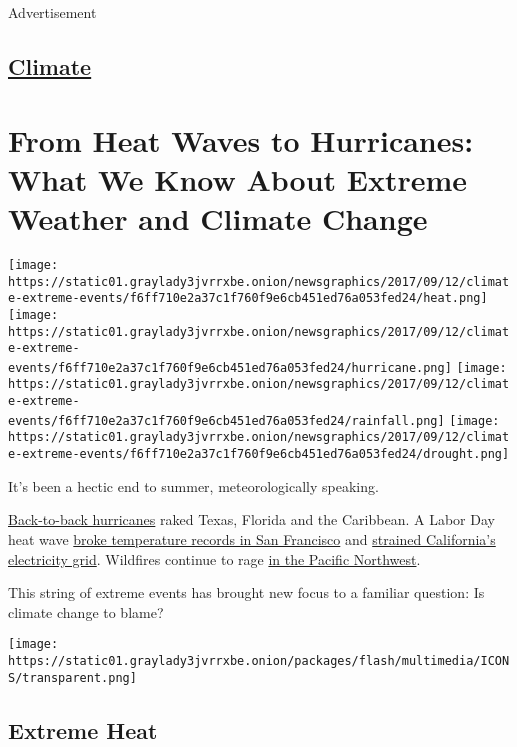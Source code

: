 Advertisement

\hypertarget{-climate-}{%
\subsection{\texorpdfstring{ \href{/section/climate}{Climate}
}{ Climate }}\label{-climate-}}

\hypertarget{from-heat-waves-to-hurricanes-what-we-know-about-extreme-weather-and-climate-change}{%
\section{From Heat Waves to Hurricanes: What We Know About Extreme
Weather and Climate
Change}\label{from-heat-waves-to-hurricanes-what-we-know-about-extreme-weather-and-climate-change}}

\texttt{[image: https://static01.graylady3jvrrxbe.onion/newsgraphics/2017/09/12/climate-extreme-events/f6ff710e2a37c1f760f9e6cb451ed76a053fed24/heat.png]}
\texttt{[image: https://static01.graylady3jvrrxbe.onion/newsgraphics/2017/09/12/climate-extreme-events/f6ff710e2a37c1f760f9e6cb451ed76a053fed24/hurricane.png]}
\texttt{[image: https://static01.graylady3jvrrxbe.onion/newsgraphics/2017/09/12/climate-extreme-events/f6ff710e2a37c1f760f9e6cb451ed76a053fed24/rainfall.png]}
\texttt{[image: https://static01.graylady3jvrrxbe.onion/newsgraphics/2017/09/12/climate-extreme-events/f6ff710e2a37c1f760f9e6cb451ed76a053fed24/drought.png]}

It's been a hectic end to summer, meteorologically speaking.

\href{https://www.nytimes3xbfgragh.onion/2017/09/06/climate/storms-harvey-irma-jose.html}{Back-to-back
hurricanes} raked Texas, Florida and the Caribbean. A Labor Day heat
wave
\href{https://weather.com/forecast/regional/news/west-heat-wave-all-time-record-heat-early-september-2017}{broke
temperature records in San Francisco} and
\href{http://www.latimes.com/local/lanow/la-me-ln-heat-warnings-socal-20170829-story.html}{strained
California's electricity grid}. Wildfires continue to rage
\href{https://www.nytimes3xbfgragh.onion/interactive/2017/09/16/us/wildfires-smoke-pacific-northwest.html}{in
the Pacific Northwest}.

This string of extreme events has brought new focus to a familiar
question: Is climate change to blame?

\texttt{[image: https://static01.graylady3jvrrxbe.onion/packages/flash/multimedia/ICONS/transparent.png]}

\hypertarget{extreme-heat}{%
\subsection{Extreme Heat}\label{extreme-heat}}

